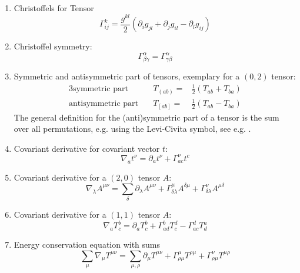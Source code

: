 \documentclass[12pt,a4paper]{report}
\numberwithin{equation}{chapter}
\begin{document}
\begin{appendices}
\begin{enumerate}
\item Christoffels for Tensor
\begin{equation}
\Gamma^k_{ij} = \frac {g^{kl}}2
\left(
\partial_i g_{jl} +
\partial_j g_{il} -
\partial_l g_{ij}
\right)
\end{equation}

\item Christoffel symmetry:
\begin{equation}
\Gamma^\alpha_{\beta\gamma} =
\Gamma^\alpha_{\gamma\beta}
\end{equation}

\item Symmetric and antisymmetric part of tensors, exemplary for a $(0,2)$ tensor:
\begin{alignat}{3}
\label{eq:formulary-symmetric-part}
\text{symmetric part}\quad &T_{(a b)} = &\frac 12 ( T_{ab} + T_{ba} ) \\
\text{antisymmetric part}\quad &T_{[a b]} = &\frac 12 ( T_{ab} - T_{ba} )
\end{alignat}
The general definition for the (anti)symmetric part of a tensor is the sum over all permutations, e.g. using the Levi-Civita symbol, see e.g. \cite{WaldGR}.

\item Covariant derivative for covariant vector $t$:
\begin{equation}
\nabla_a t^\nu = \partial_a t^\nu + 
\Gamma^\nu_{ac} t^c
\end{equation}

\item Covariant derivative for a $(2,0)$ tensor $A$:
\begin{equation}
\nabla_\lambda A^{\mu\nu} =
\sum_\delta
\partial_\lambda A^{\mu\nu} +
\Gamma^\mu_{\delta \lambda} A^{\delta \mu} + 
\Gamma^\nu_{\delta \lambda} A^{\mu \delta}
\end{equation}

\item Covariant derivative for a $(1,1)$ tensor $A$:
\begin{equation}
\nabla_a T^b_c = 
\partial_a T^b_c +
\Gamma^b_{ad} T^d_c -
\Gamma^d_{ac} T^a_d
\end{equation}

\item Energy conservation equation with sums
\begin{equation}
\sum_\mu \nabla_\mu T^{\mu\nu} = 
\sum_{\mu,\rho}
\partial_\mu T^{\mu \nu} +
\Gamma^{\mu}_{\rho\mu} T^{\rho \mu} +
\Gamma^{\nu}_{\rho\mu} T^{\mu\rho}
\end{equation}


\end{enumerate}
\end{appendices}
\end{document}
